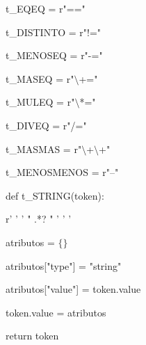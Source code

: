 \begin{multicols}{2}

t\_EQEQ = r"=="

t\_DISTINTO = r"!="

t\_MENOSEQ = r"-="

t\_MASEQ = r"$\setminus$+="

t\_MULEQ = r"$\setminus$*="

t\_DIVEQ = r"/="

t\_MASMAS = r"$\setminus$+$\setminus$+"

t\_MENOSMENOS = r"--"

\columnbreak

def t\_STRING(token):

\hspace{5mm}    r' ' ' " .*? " ' ' '
    
\hspace{5mm}    atributos = $\{ \} $
    
\hspace{5mm}    atributos["type"] = "string"
    
\hspace{5mm}    atributos["value"] = token.value
    
\hspace{5mm}    token.value = atributos
    
\hspace{5mm}    return token
 
\end{multicols} 
    
